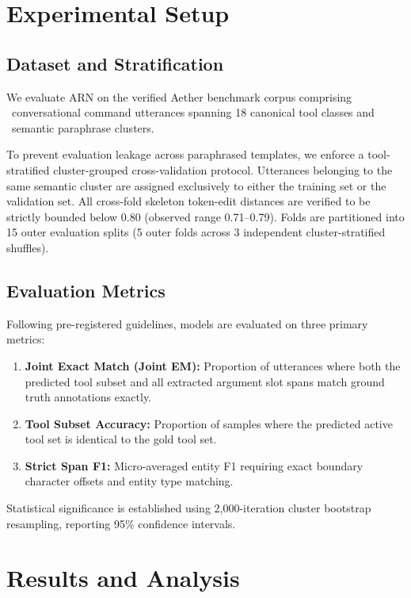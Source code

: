 \documentclass[letterpaper]{article}
\begin{document}
\section{Experimental Setup}

\subsection{Dataset and Stratification}
We evaluate ARN on the verified Aether benchmark corpus comprising \TotalDatasetSamples\ conversational command utterances spanning 18 canonical tool classes and \TotalClusters\ semantic paraphrase clusters.

To prevent evaluation leakage across paraphrased templates, we enforce a tool-stratified cluster-grouped cross-validation protocol. Utterances belonging to the same semantic cluster are assigned exclusively to either the training set or the validation set. All cross-fold skeleton token-edit distances are verified to be strictly bounded below 0.80 (observed range 0.71--0.79). Folds are partitioned into 15 outer evaluation splits (5 outer folds across 3 independent cluster-stratified shuffles).

\subsection{Evaluation Metrics}
Following pre-registered guidelines, models are evaluated on three primary metrics:
\begin{enumerate}
    \item \textbf{Joint Exact Match (Joint EM):} Proportion of utterances where both the predicted tool subset and all extracted argument slot spans match ground truth annotations exactly.
    \item \textbf{Tool Subset Accuracy:} Proportion of samples where the predicted active tool set is identical to the gold tool set.
    \item \textbf{Strict Span F1:} Micro-averaged entity F1 requiring exact boundary character offsets and entity type matching.
\end{enumerate}
Statistical significance is established using 2,000-iteration cluster bootstrap resampling, reporting 95\% confidence intervals.

\section{Results and Analysis}


\end{document}
